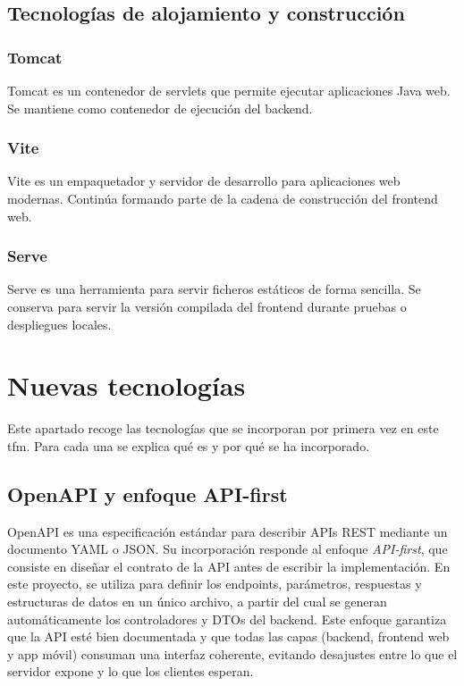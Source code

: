 \subsection{Tecnologías de alojamiento y construcción}

\subsubsection{Tomcat}
Tomcat \cite{tomcat} es un contenedor de servlets que permite ejecutar aplicaciones Java web. Se mantiene como contenedor de ejecución del backend.

\subsubsection{Vite}
Vite \cite{vite} es un empaquetador y servidor de desarrollo para aplicaciones web modernas. Continúa formando parte de la cadena de construcción del frontend web.

\subsubsection{Serve}
Serve \cite{serve} es una herramienta para servir ficheros estáticos de forma sencilla. Se conserva para servir la versión compilada del frontend durante pruebas o despliegues locales.

\section{Nuevas tecnologías}

Este apartado recoge las tecnologías que se incorporan por primera vez en este \acrshort{tfm}. Para cada una se explica qué es y por qué se ha incorporado.

\subsection{OpenAPI y enfoque API-first}
OpenAPI \cite{OpenAPI} es una especificación estándar para describir APIs REST mediante un documento YAML o JSON. Su incorporación responde al enfoque \textit{API-first}, que consiste en diseñar el contrato de la API antes de escribir la implementación. En este proyecto, \cite{OpenAPI} se utiliza para definir los endpoints, parámetros, respuestas y estructuras de datos en un único archivo, a partir del cual se generan automáticamente los controladores y DTOs del backend. Este enfoque garantiza que la API esté bien documentada y que todas las capas (backend, frontend web y app móvil) consuman una interfaz coherente, evitando desajustes entre lo que el servidor expone y lo que los clientes esperan.

